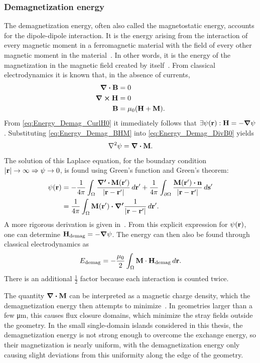 \documentclass[11pt,a4paper,english,twoside]{article}
\begin{document}
\subsubsection{Demagnetization energy}
The demagnetization energy, often also called the magnetostatic energy, accounts for the dipole-dipole interaction. It is the energy arising from the interaction of every magnetic moment in a ferromagnetic material with the field of every other magnetic moment in the material~\cite{NML_Carlton}. In other words, it is the energy of the magnetization in the magnetic field created by itself~\cite{abert2013discrete}.
From classical electrodynamics it is known that, in the absence of currents,
\begin{align}
	\div{\vb{B}} &= 0 \label{eq:Energy_Demag_DivB0} \\
	\curl{\vb{H}} &= 0 \label{eq:Energy_Demag_CurlH0} \\
	\vb{B} &= \mu_0 (\vb{H} + \vb{M}) \label{eq:Energy_Demag_BHM} \mathrm{.}
\end{align}
From \eqref{eq:Energy_Demag_CurlH0} it immediately follows that $\exists \psi(\vb{r}): \vb{H} = -\gradient{\psi}$. Substituting \eqref{eq:Energy_Demag_BHM} into \eqref{eq:Energy_Demag_DivB0} yields
\begin{equation}
    \laplacian{\psi} = \div{\vb{M}} \mathrm{.}
\end{equation}
The solution of this Laplace equation, for the boundary condition $\abs{\vb{r}} \rightarrow \infty \Rightarrow \psi \rightarrow 0$, is found using Green's function and Green's theorem:
\begin{align*}
    \psi(\vb{r}) &= -\frac{1}{4\pi}\int_\Omega \frac{\boldsymbol{\nabla'\,\vdot}\,\vb{M}(\vb{r'})}{\abs{\vb{r}-\vb{r'}}} \,d\vb{r'} + \frac{1}{4\pi}\int_{\partial\Omega} \frac{\vb{M}(\vb{r'}) \vdot \vb{n}}{\abs{\vb{r}-\vb{r'}}} \,d\vb{s'} \\
    &= \frac{1}{4\pi}\int_\Omega \vb{M}(\vb{r'}) \vdot \boldsymbol{\nabla'} \frac{1}{\abs{\vb{r}-\vb{r'}}} \,d\vb{r'} \mathrm{.}
\end{align*}
A more rigorous derivation is given in~\cite{abert2013discrete}.
From this explicit expression for $\psi(\vb{r})$, one can determine $\vb{H_\mathrm{demag}} = -\gradient{\psi}$. The energy can then also be found through classical electrodynamics as
\begin{equation}
    E_\mathrm{demag} = -\frac{\mu_0}{2} \int_\Omega \vb{M} \cdot \vb{H_\mathrm{demag}} \, d\vb{r} \mathrm{.} \label{eq:Energy_Term_Demag}
\end{equation}
There is an additional $\frac{1}{2}$ factor because each interaction is counted twice. \par
The quantity $\div{\vb{M}}$ can be interpreted as a magnetic charge density, which the demagnetization energy then attempts to minimize~\cite{MagneticCharge}. In geometries larger than a few \si{\micro\metre}, this causes flux closure domains, which minimize the stray fields outside the geometry. In the small single-domain islands considered in this thesis, the demagnetization energy is not strong enough to overcome the exchange energy, so their magnetization is nearly uniform, with the demagnetization energy only causing slight deviations from this uniformity along the edge of the geometry.
\end{document}
